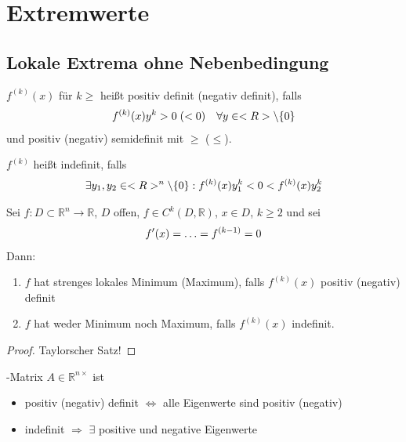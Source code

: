 \section{Extremwerte} \setcounter{equation}{0}
\subsection{Lokale Extrema ohne Nebenbedingung}

\begin{*definition}
	$f^{(k)}(x)$ für $k\ge $ heißt positiv definit (negativ definit), falls \begin{align}
		f^{(k)}(x) y^k > 0 \;(< 0) \quad\forall y\in\mathbb{R}\setminus \{0\}\notag
	\end{align}
	und positiv (negativ) semidefinit mit $\ge$ ($\le$).
	
	$f^{(k)}$ heißt indefinit, falls \begin{align}
		\exists y_1, y_2\in\mathbb{R}^n\setminus \{0\}: f^{(k)}(x) y_1^k < 0 < f^{(k)} (x) y_2^k\notag
	\end{align}
\end{*definition}

\begin{proposition}
	Sei $f:D\subset\mathbb{R}^n\to\mathbb{R}$, $D$ offen, $f\in C^k(D,\mathbb{R})$, $x\in D$, $k\ge 2$ und sei \begin{align}
		f'(x) = \dotsc = f^{(k-1)} = 0\notag
	\end{align}
	Dann: \begin{enumerate}[label={\alph*)}]
		\item $f$ hat strenges lokales Minimum (Maximum), falls $f^{(k)}(x)$ positiv (negativ) definit
		\item {}
		$f$ hat weder Minimum noch Maximum, falls $f^{(k)}(x)$ indefinit.
	\end{enumerate}
\end{proposition}

\begin{proof}\hspace*{0pt}
	Taylorscher Satz!
\end{proof}

\begin{boldenvironment}
	-Matrix $A\in\mathbb{R}^{n\times}$ ist \begin{itemize}
		\item positiv (negativ) definit $\Leftrightarrow$ alle Eigenwerte sind positiv (negativ) 
		\item indefinit $\Rightarrow$ $\exists$ positive und negative Eigenwerte
	\end{itemize}
\end{boldenvironment}

